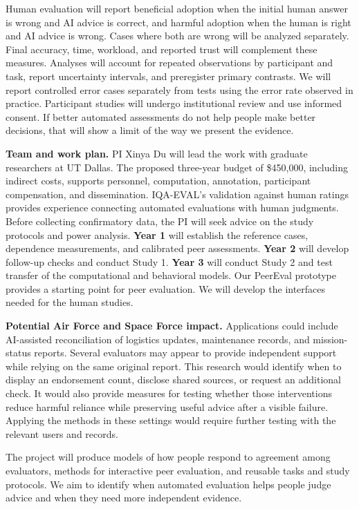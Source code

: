 \documentclass[12pt]{article}
\begin{document}
Human evaluation will report beneficial adoption when the initial human answer is wrong and AI advice is correct, and harmful adoption when the human is right and AI advice is wrong. Cases where both are wrong will be analyzed separately. Final accuracy, time, workload, and reported trust will complement these measures. Analyses will account for repeated observations by participant and task, report uncertainty intervals, and preregister primary contrasts. We will report controlled error cases separately from tests using the error rate observed in practice. Participant studies will undergo institutional review and use informed consent. If better automated assessments do not help people make better decisions, that will show a limit of the way we present the evidence.

\noindent\textbf{Team and work plan.} PI Xinya Du will lead the work with graduate researchers at UT Dallas. The proposed three-year budget of \$450,000, including indirect costs, supports personnel, computation, annotation, participant compensation, and dissemination. IQA-EVAL's validation against human ratings provides experience connecting automated evaluations with human judgments. Before collecting confirmatory data, the PI will seek advice on the study protocols and power analysis. \textbf{Year 1} will establish the reference cases, dependence measurements, and calibrated peer assessments. \textbf{Year 2} will develop follow-up checks and conduct Study 1. \textbf{Year 3} will conduct Study 2 and test transfer of the computational and behavioral models. Our PeerEval prototype provides a starting point for peer evaluation. We will develop the interfaces needed for the human studies.

\textbf{Potential Air Force and Space Force impact.} Applications could include AI-assisted reconciliation of logistics updates, maintenance records, and mission-status reports. Several evaluators may appear to provide independent support while relying on the same original report. This research would identify when to display an endorsement count, disclose shared sources, or request an additional check. It would also provide measures for testing whether those interventions reduce harmful reliance while preserving useful advice after a visible failure. Applying the methods in these settings would require further testing with the relevant users and records.

The project will produce models of how people respond to agreement among evaluators, methods for interactive peer evaluation, and reusable tasks and study protocols. We aim to identify when automated evaluation helps people judge advice and when they need more independent evidence.

\clearpage

  {}
  {}
\end{document}
